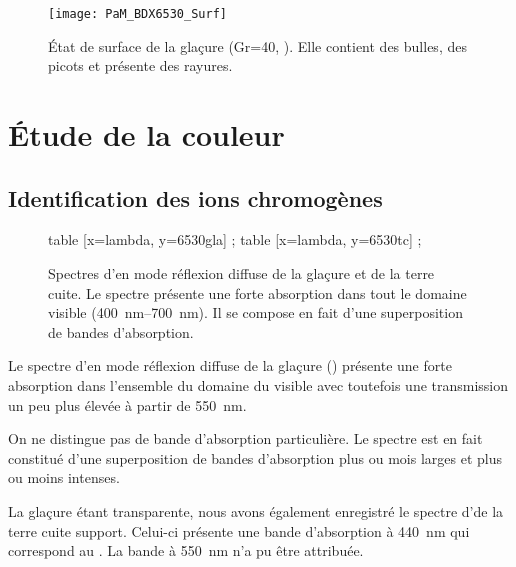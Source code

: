 \begin{figure}[htb]
  \texttt{[image: PaM\_BDX6530\_Surf]}
  \caption{\legendeC 
           État de surface de la glaçure (Gr=\num{40}, ). Elle contient des 
           bulles, des picots et présente des rayures.}
  \label{surf:6530}
\end{figure}


\section{Étude de la couleur}

\subsection{Identification des ions chromogènes}
\begin{figure}[htb]
  \begin{plotspectre}
       table [x=lambda, y=6530gla] {\gladata} ;
       table [x=lambda, y=6530tc] {\tcdata} ;
  \end{plotspectre}
  \caption{\legendeC 
           Spectres d'\AO en mode réflexion diffuse de la glaçure et de la terre cuite. Le spectre présente une forte absorption dans tout le domaine visible (\SIrange{400}{700}{\nm}). Il se compose en fait d'une superposition de bandes d'absorption.}
  \label{spectre:6530}
\end{figure}

Le spectre d'\AO en mode réflexion diffuse de la glaçure () présente une forte absorption dans l'ensemble du domaine du visible avec toutefois une transmission un peu plus élevée à partir de \SI{550}{\nm}.

On ne distingue pas de bande d'absorption particulière. Le spectre est 
en fait constitué d'une superposition de bandes d'absorption plus ou 
mois larges et plus ou moins intenses.

La glaçure étant transparente, nous avons également enregistré le spectre d'\AO de la terre cuite support. Celui-ci présente une bande d'absorption à \SI{440}{\nm} qui correspond au  \autocite{Lajarte_1979}. La bande à \SI{550}{\nm} n'a pu être attribuée.

